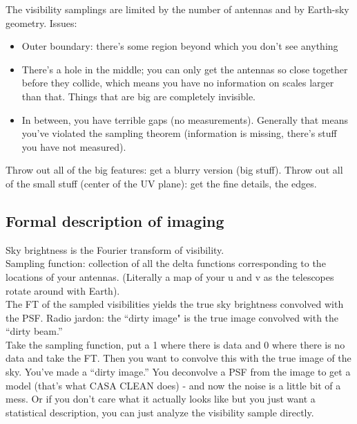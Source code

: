 \documentclass[a4paper]{article}
\begin{document}
The visibility samplings are limited by the number of antennas and by Earth-sky geometry. Issues:

\begin{itemize}

\item Outer boundary: there's some region beyond which you don't see anything
\item There's a hole in the middle; you can only get the antennas so close together before they collide, which means you have no information on scales larger than that. Things that are big are completely invisible.
\item In between, you have terrible gaps (no measurements). Generally that means you've violated the sampling theorem (information is missing, there's stuff you have not measured). 

\end{itemize}

Throw out all of the big features: get a blurry version (big stuff). Throw out all of the small stuff (center of the UV plane): get the fine details, the edges. 

\subsection{Formal description of imaging}

Sky brightness is the Fourier transform of visibility. \\

Sampling function: collection of all the delta functions corresponding to the locations of your antennas. (Literally a map of your u and v as the telescopes rotate around with Earth). \\

The FT of the sampled visibilities yields the true sky brightness convolved with the PSF. Radio jardon: the ``dirty image" is the true image convolved with the ``dirty beam.'' \\

Take the sampling function, put a 1 where there is data and 0 where there is no data and take the FT. Then you want to convolve this with the true image of the sky. You've made a ``dirty image.''
You deconvolve a PSF from the image to get a model (that's what CASA CLEAN does) - and now the noise is a little bit of a mess.
Or if you don't care what it actually looks like but you just want a statistical description, you can just analyze the visibility sample directly. \\
\end{document}
